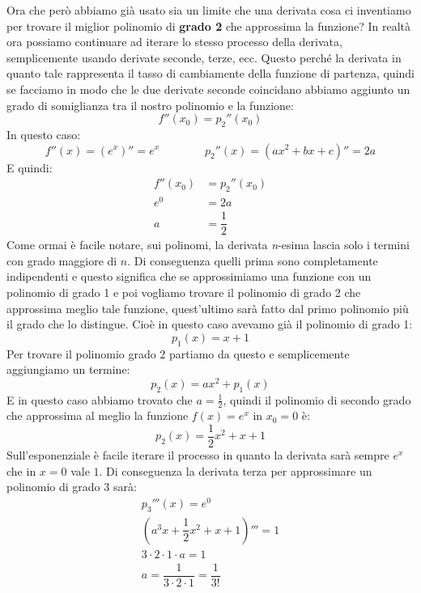 Ora che però abbiamo già usato sia un limite che una derivata cosa ci inventiamo per trovare il miglior polinomio di \textbf{grado 2} che approssima la funzione? In realtà ora possiamo continuare ad iterare lo stesso processo della derivata, semplicemente usando derivate seconde, terze, ecc. Questo perché la derivata in quanto tale rappresenta il tasso di cambiamente della funzione di partenza, quindi se facciamo in modo che le due derivate seconde coincidano abbiamo aggiunto un grado di somiglianza tra il nostro polinomio e la funzione:
\begin{equation*}
	f''(x_0) = p_2''(x_0)
\end{equation*}
In questo caso:
\begin{equation*}
	f''(x) = (e^x)'' = e^x \qquad \qquad p_2''(x) = (ax^2 + bx + c)'' = 2a
\end{equation*}
E quindi:
\begin{align*}
	f''(x_0) &= p_2''(x_0)\\
	e^{0} & = 2a\\
	a & = \dfrac{1}{2}
\end{align*}
Come ormai è facile notare, sui polinomi, la derivata \textit{n}-esima lascia solo i termini con grado maggiore di $n$. Di conseguenza quelli prima sono completamente indipendenti e questo significa che se approssimiamo una funzione con un polinomio di grado 1 e poi vogliamo trovare il polinomio di grado 2 che approssima meglio tale funzione, quest'ultimo sarà fatto dal primo polinomio più il grado che lo distingue. Cioè in questo caso avevamo già il polinomio di grado 1: 
\begin{equation*}
	p_1(x) = x + 1
\end{equation*}
Per trovare il polinomio grado 2 partiamo da questo e semplicemente aggiungiamo un termine:
\begin{equation*}
	p_2(x) = ax^2 + p_1(x)
\end{equation*}
E in questo caso abbiamo trovato che $a = \frac{1}{2}$, quindi il polinomio di secondo grado che approssima al meglio la funzione $f(x) = e^x$ in $x_0 = 0$ è:
\begin{equation*}
	p_2(x) = \dfrac{1}{2}x^2 + x + 1
\end{equation*}
Sull'esponenziale è facile iterare il processo in quanto la derivata sarà sempre $e^x$ che in $x = 0$ vale $1$. Di conseguenza la derivata terza per approssimare un polinomio di grado 3 sarà:
\begin{gather*}
	p_3'''(x) = e^0\\
	(a^3x + \dfrac{1}{2}x^2 + x + 1)''' = 1\\
	3 \cdot 2 \cdot 1 \cdot a = 1\\
	a = \dfrac{1}{3 \cdot 2 \cdot 1} = \dfrac{1}{3!}
\end{gather*}
